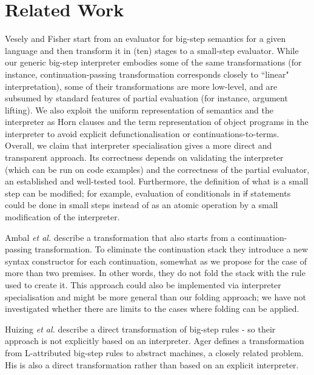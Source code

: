\documentclass{llncs}
\newcommand{\keyword}[1]{\mathsf{#1}}
\begin{document}
\section{Related Work}
Vesely and Fisher \cite{VeselyF19} start from an evaluator for big-step semantics 
for a given language and then
transform it in (ten) stages to a small-step evaluator.  While our generic big-step interpreter embodies some of the same transformations (for instance,
continuation-passing transformation corresponds closely to ``linear" interpretation), some of their transformations are more low-level,
and are subsumed by standard features of partial evaluation (for instance, argument lifting).  We also exploit the uniform 
representation of semantics and the interpreter as Horn clauses and the term representation of object programs in the interpreter to avoid
explicit defunctionalisation or continuations-to-terms. Overall, we claim that interpreter specialisation gives a more direct and
transparent approach. Its correctness depends on validating the interpreter (which can be run on code examples)
and the correctness of the partial evaluator, an established and well-tested tool.  Furthermore, the definition of what is a small step can be
modified;  for example, evaluation of conditionals in $\keyword{if}$ statements could be done in small steps instead of as an atomic operation
by a small modification of the interpreter.

Ambal \emph{et al.} \cite{AmbalLSN22} describe a transformation that also starts from a continuation-passing transformation. To eliminate the 
continuation stack they introduce a new syntax constructor for each continuation, somewhat as we propose for the case of more than two premises.
In other words, they do not fold the stack with the rule used to create it.  This approach could also be implemented via interpreter specialisation
and might be more general than our folding approach;  we have not investigated whether there are limits to the cases where folding can be applied.

Huizing \emph{et al.} \cite{HuizingKK10} describe a direct transformation of big-step rules - so their approach is not explicitly based
on an interpreter.  Ager \cite{Ager04} defines a transformation from L-attributed big-step rules to abstract machines, a closely related problem.  His is
also a direct transformation rather than based on an explicit interpreter.  


%

\end{document}
